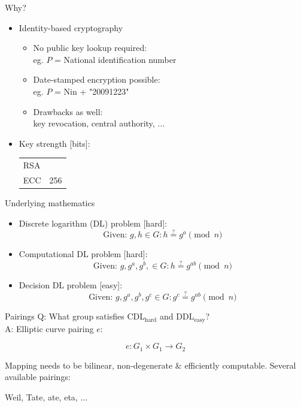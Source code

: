 \documentclass{beamer}
\begin{document}
\begin{frame}{Why?}
	\begin{itemize}
  		\item<1-> Identity-based cryptography\\
  			\begin{itemize}
				\item<1-> No public key lookup required:\\
					eg. $P$ = National identification number
				\item<2-> Date-stamped encryption possible:\\
					eg. $P$ = Nin + "20091223"
				\item<3-> Drawbacks as well:\\
					key revocation, central authority, $\ldots$
			\end{itemize}
		\item<4-> Key strength [bits]:\\
			\begin{tabular}{ll}
				RSA			&	\\
				\alert{ECC}	&	\alert{256}\\
			\end{tabular}
	\end{itemize}
\end{frame}

\begin{frame}{Underlying mathematics}
	\begin{itemize}
		\item<1-> Discrete logarithm (DL) problem [hard]:\\
				\[\text{Given: } g, h \in G \colon h \overset{?}{=} g^a \pmod n\]
		\item<2-> Computational DL problem [hard]:\\
				\[\text{Given: } g, g^a, g^b, \in G \colon h \overset{?}{=} g^{ab} \pmod n\]
		\item<3-> Decision DL problem [easy]:\\
				\[\text{Given: } g, g^a, g^b, g^c \in G \colon g^c \overset{?}{=} g^{ab} \pmod n \]
	\end{itemize}
\end{frame}

\begin{frame}{Pairings}
	Q: What group satisfies CDL$_{\text{hard}}$ and DDL$_{\text{easy}}$?\\
	A: Elliptic curve pairing $e$:
	
	\[ e : G_1 \times G_1 \rightarrow G_2 \]
	
	Mapping needs to be bilinear, non-degenerate \& efficiently computable.
	Several available pairings:\\
	
	\begin{center}Weil, \alert{Tate}, ate, eta, $\ldots$\end{center}
\end{frame}
\end{document}
